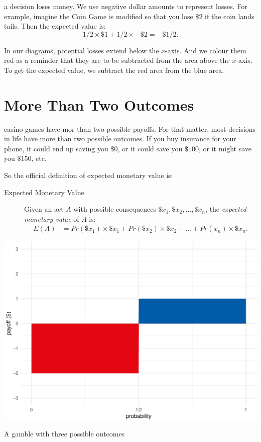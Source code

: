 \documentclass[justified]{tufte-book}
\newcommand{\p}{Pr}
\newcommand{\E}{E}
\theoremstyle{definition}
\theoremstyle{definition}
\theoremstyle{definition}
\theoremstyle{remark}
\begin{document}
 a decision loses money. We use negative dollar
amounts to represent losses. For example, imagine the Coin Game is
modified so that you lose \(\$2\) if the coin lands tails. Then the
expected value is: \[ 1/2 \times \$1 + 1/2 \times -\$2 = -\$1/2.\]

In our diagrams, potential losses extend below the \(x\)-axis. And we
colour them red as a reminder that they are to be subtracted from the
area above the \(x\)-axis. To get the expected value, we subtract the
red area from the blue area.

\hypertarget{more-than-two-outcomes}{%
\section{More Than Two Outcomes}\label{more-than-two-outcomes}}

 casino games have mor than two possible payoffs. For
that matter, most decisions in life have more than two possible
outcomes. If you buy insurance for your phone, it could end up saving
you \(\$0\), or it could save you \(\$100\), or it might save you
\(\$150\), etc.

So the official definition of expected monetary value is:

\begin{description}
\item[Expected Monetary Value]
Given an act \(A\) with possible consequences
\(\$x_1, \$x_2, \ldots, \$x_n\), the \emph{expected monetary value} of
\(A\) is: \[
  \begin{aligned}
\E(A) &= \p(\$x_1) \times \$x_1 + \p(\$x_2) \times \$x_2 + \ldots + \p(x_n) \times \$x_n.
  \end{aligned}
\]
\end{description}

\begin{marginfigure}
\includegraphics{_main_files/figure-latex/unnamed-chunk-91-1} \caption[A gamble with three possible outcomes]{A gamble with three possible outcomes}\label{fig:unnamed-chunk-91}
\end{marginfigure}
\end{document}
